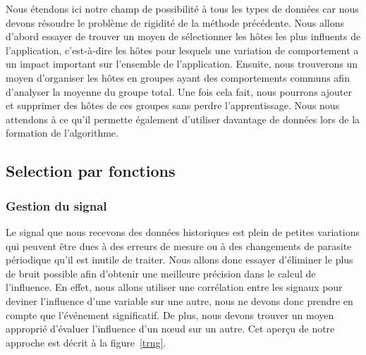 \documentclass[10pt,a4paper,oneside]{article}
\begin{document}
\begin{multicols}{2}
Nous étendons ici notre champ de possibilité à tous les types de données car nous devons résoudre le problème de rigidité de la méthode précédente. Nous allons d’abord essayer de trouver un moyen de sélectionner les hôtes les plus influents de l’application, c’est-à-dire les hôtes pour lesquels une variation de comportement a un impact important sur l’ensemble de l’application. Ensuite, nous trouverons un moyen d'organiser les hôtes en groupes ayant des comportements communs afin d'analyser la moyenne du groupe total. Une fois cela fait, nous pourrons ajouter et supprimer des hôtes de ces groupes sans perdre l'apprentissage. Nous nous attendons à ce qu’il permette également d’utiliser davantage de données lors de la formation de l’algorithme.
\end{multicols}

\vspace{0.8cm}

\begin{multicols}{2}

\subsection{Selection par fonctions}
\subsubsection{Gestion du signal}
Le signal que nous recevons des données historiques est plein de petites variations qui peuvent être dues à des erreurs de mesure ou à des changements de parasite périodique qu’il est inutile de traiter. Nous allons donc essayer d’éliminer le plus de bruit possible afin d’obtenir une meilleure précision dans le calcul de l’influence. En effet, nous allons utiliser une corrélation entre les signaux pour deviner l’influence d’une variable sur une autre, nous ne devons donc prendre en compte que l’événement significatif. De plus, nous devons trouver un moyen approprié d’évaluer l’influence d’un nœud sur un autre. Cet aperçu de notre approche est décrit à la figure~\ref{trng}.
\end{multicols}

\vspace{0.8cm}
\end{document}
